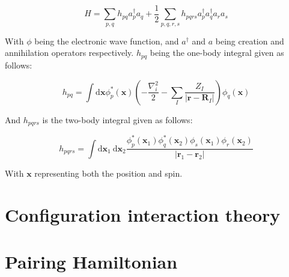 \documentclass[../main.tex]{subfiles}
\begin{document}
\begin{equation*}
H=\sum_{p, q} h_{p q} a_{p}^{\dagger} a_{q}+\frac{1}{2} \sum_{p, q, r, s} h_{p q r s} a_{p}^{\dagger} a_{q}^{\dagger} a_{r} a_{s}
\end{equation*}

With $\phi$ being the electronic wave function, and $a^\dagger$ and $a$ being creation and annihilation operators respectively. $h_{pq}$ being the one-body integral given as follows:

\begin{equation*}
h_{p q}=\int \mathrm{d} \mathbf{x} \phi_{p}^{*}(\mathbf{x})\left(-\frac{\nabla_{i}^{2}}{2}-\sum_{I} \frac{Z_{I}}{\left|\mathbf{r}-\mathbf{R}_{I}\right|}\right) \phi_{q}(\mathbf{x})
\end{equation*}

And $h_{pqrs}$ is the two-body integral given as follows:

\begin{equation*}
h_{p q r s}=\int \mathrm{d} \mathbf{x}_{1} \mathrm{~d} \mathbf{x}_{2} \frac{\phi_{p}^{*}\left(\mathbf{x}_{1}\right) \phi_{q}^{*}\left(\mathbf{x}_{2}\right) \phi_{s}\left(\mathbf{x}_{1}\right) \phi_{r}\left(\mathbf{x}_{2}\right)}{\left|\mathbf{r}_{1}-\mathbf{r}_{2}\right|}
\end{equation*}

With $\boldsymbol{x}$ representing both the position and spin.


\section{Configuration interaction theory}
\section{Pairing Hamiltonian}
\end{document}
